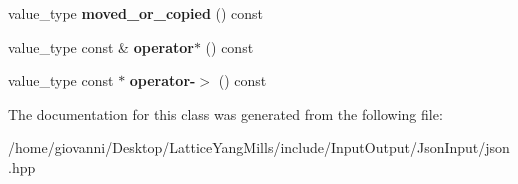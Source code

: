 \begin{DoxyCompactItemize}
\item 
value\+\_\+type {\bfseries moved\+\_\+or\+\_\+copied} () const \hypertarget{classnlohmann_1_1detail_1_1json__ref_ab82818e9b8cc63cb76e61fe6b68959a5}{}\label{classnlohmann_1_1detail_1_1json__ref_ab82818e9b8cc63cb76e61fe6b68959a5}

\item 
value\+\_\+type const \& {\bfseries operator$\ast$} () const \hypertarget{classnlohmann_1_1detail_1_1json__ref_adec75260903212a3bf1235fced3f2e51}{}\label{classnlohmann_1_1detail_1_1json__ref_adec75260903212a3bf1235fced3f2e51}

\item 
value\+\_\+type const $\ast$ {\bfseries operator-\/$>$} () const \hypertarget{classnlohmann_1_1detail_1_1json__ref_ae4492a0e856ba9bb8739e9bba988a8c6}{}\label{classnlohmann_1_1detail_1_1json__ref_ae4492a0e856ba9bb8739e9bba988a8c6}

\end{DoxyCompactItemize}


The documentation for this class was generated from the following file\+:\begin{DoxyCompactItemize}
\item 
/home/giovanni/\+Desktop/\+Lattice\+Yang\+Mills/include/\+Input\+Output/\+Json\+Input/json.\+hpp\end{DoxyCompactItemize}

